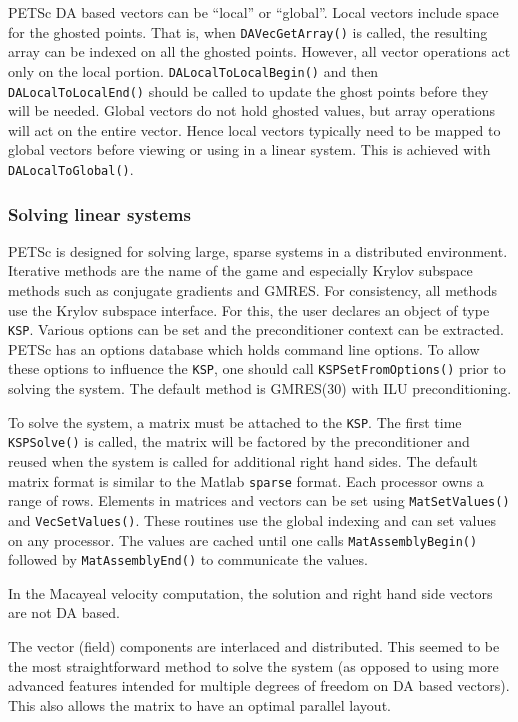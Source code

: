 \documentclass[12pt,final]{amsart}
\renewcommand{\t}[1]{\texttt{#1}}
\begin{document}
PETSc DA based vectors can be ``local'' or ``global''. Local vectors include space for the
ghosted points. That is, when \texttt{DAVecGetArray()} is called, the resulting array can
be indexed on all the ghosted points. However, all vector operations act only on the local
portion. \texttt{DALocalToLocalBegin()} and then \texttt{DALocalToLocalEnd()} should be
called to update the ghost points before they will be needed. Global vectors do not hold
ghosted values, but array operations will act on the entire vector. Hence local vectors
typically need to be mapped to global vectors before viewing or using in a linear system.
This is achieved with \texttt{DALocalToGlobal()}.

\subsubsection{Solving linear systems}
PETSc is designed for solving large, sparse systems in a distributed environment.
Iterative methods are the name of the game and especially Krylov subspace methods such as
conjugate gradients and GMRES. For consistency, all methods use the Krylov subspace
interface. For this, the user declares an object of type \texttt{KSP}. Various options can
be set and the preconditioner context can be extracted. PETSc has an options database
which holds command line options. To allow these options to influence the \t{KSP}, one
should call \t{KSPSetFromOptions()} prior to solving the system. The default method is
GMRES(30) with ILU preconditioning.

To solve the system, a matrix must be attached to the \t{KSP}. The first time
\t{KSPSolve()} is called, the matrix will be factored by the preconditioner and reused
when the system is called for additional right hand sides. The default matrix format is
similar to the Matlab \t{sparse} format. Each processor owns a range of rows. Elements in
matrices and vectors can be set using \t{MatSetValues()} and \t{VecSetValues()}. These
routines use the global indexing and can set values on any processor. The values are
cached until one calls \t{MatAssemblyBegin()} followed by \t{MatAssemblyEnd()} to
communicate the values.

In the Macayeal velocity computation, the solution and right hand side vectors are not DA
based.

The vector (field) components are interlaced and distributed. This seemed to be the
most straightforward method to solve the system (as opposed to using more advanced
features intended for multiple degrees of freedom on DA based vectors). This also allows
the matrix to have an optimal parallel layout.
\end{document}
